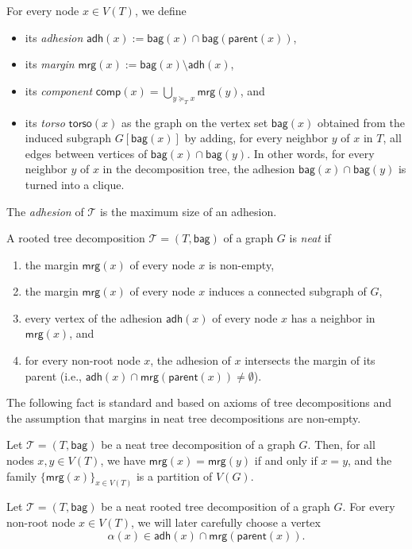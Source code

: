 \documentclass[1p,number,11pt]{elsarticle}
\theoremstyle{plain}
\newcommand{\bag}{\mathsf{bag}}
\newcommand{\comp}{\mathsf{comp}}
\newcommand{\mrg}{\mathsf{mrg}}
\newcommand{\adh}{\mathsf{adh}}
\newcommand{\torso}{\mathsf{torso}}
\newcommand{\parent}{\mathsf{parent}}
\begin{document}
For every node $x\in V(T)$, we define
\begin{itemize}
    \item its \emph{adhesion} $\adh(x):=\bag(x)\cap \bag(\parent(x))$, 
    \item its \emph{margin} $\mrg(x):=\bag(x)\setminus \adh(x)$, 
    \item its \emph{component} $\comp(x)=\bigcup_{y\succeq_T x}\mrg(y)$, and
    \item its \emph{torso} $\torso(x)$ as the graph on the vertex set $\bag(x)$ obtained from the induced subgraph $G[\bag(x)]$ by adding, for every neighbor $y$ of $x$ in $T$, all edges between vertices of
$\bag(x)\cap \bag(y)$. 
In other words, for every neighbor $y$ of $x$ in the decomposition tree, the adhesion $\bag(x)\cap \bag(y)$
is turned into a clique.
\end{itemize}

The \emph{adhesion} of $\mathcal T$ is the maximum size of an adhesion. 

\begin{definition}
\label{def:neat}
    A rooted tree decomposition $\mathcal T=(T,\bag)$ of a graph $G$ is \emph{neat} if
\begin{enumerate}[nosep]
    \item the margin $\mrg(x)$ of every node $x$ is non-empty,
    \item the margin $\mrg(x)$ of every node $x$ induces a connected subgraph of $G$,
    \item every vertex of the adhesion $\adh(x)$ of every node $x$ has a neighbor in $\mrg(x)$, and
    \item for every non-root node $x$, the adhesion of $x$ intersects the margin of its parent (i.e., $\adh(x)\cap\mrg(\parent(x))\neq\emptyset$).
\end{enumerate}    
\end{definition}

The following fact is standard and based on axioms of tree decompositions and the assumption that margins in neat tree decompositions are non-empty. 

\begin{fact}
\label{lem:margins-partition}
Let $\mathcal T=(T,\bag)$ be a neat tree decomposition of a graph $G$.
Then, for all nodes $x,y\in V(T)$,
we have 
$\mrg(x)=\mrg(y)$ if and only if 
$x=y$, and
 the family $
\{\mrg(x)\}_{x\in V(T)}$
is a partition of $V(G)$.
\end{fact}

Let $\mathcal T=(T,\bag)$ be a neat rooted tree decomposition  of a graph $G$.
For every non-root node $x\in V(T)$, we will later carefully choose a vertex
\[
\alpha(x)\in \adh(x)\cap \mrg(\parent(x)).
\]
\end{document}

